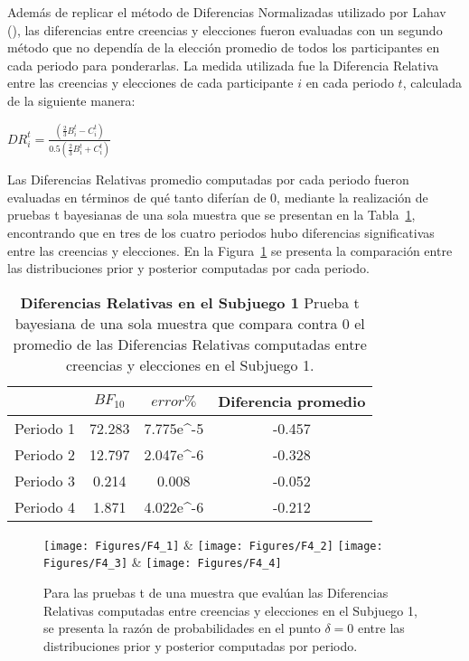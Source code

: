 Además de replicar el método de Diferencias Normalizadas utilizado por Lahav (\citeyear{Lahav}), las diferencias entre creencias y elecciones fueron evaluadas con un segundo método que no dependía de la elección promedio de todos los participantes en cada periodo para ponderarlas. La medida utilizada fue la Diferencia Relativa entre las creencias y elecciones de cada participante $i$ en cada periodo $t$, calculada de la siguiente manera:

\begin{center}
$DR_i^t =  \frac{(\frac{2}{3}B_i^t- C_i^t)}{0.5(\frac{2}{3}B_i^t + C_i^t)}$\\
\end{center}

Las Diferencias Relativas promedio computadas por cada periodo fueron evaluadas en términos de qué tanto diferían de 0, mediante la realización de pruebas t bayesianas de una sola muestra que se presentan en la Tabla~\ref{DR-S1-B}, encontrando que en tres de los cuatro periodos hubo diferencias significativas entre las creencias y elecciones. En la Figura~\ref{fig:DR_S1} se presenta la comparación entre las distribuciones prior y posterior computadas por cada periodo.\\


\begin{table}[h]
\caption[Diferencias Relativas en el Subjuego 1 (prueba t de una muestra)]{\textbf{Diferencias Relativas en el Subjuego 1} Prueba t bayesiana de una sola muestra que compara contra 0 el promedio de las Diferencias Relativas computadas entre creencias y elecciones en el Subjuego 1.}
\label{DR-S1-B}
\centering
\begin{tabular}{l | c c | c}
\toprule
\textbf{} & \textbf{$BF_{10}$} & \textbf{$error\%$} & \textbf{Diferencia promedio}\\
\midrule
Periodo 1 & 72.283 & 7.775e^-5 & -0.457\\
Periodo 2 & 12.797 & 2.047e^-6 & -0.328\\
Periodo 3 & 0.214 & 0.008 & -0.052\\
Periodo 4 & 1.871 & 4.022e^-6 & -0.212\\
\bottomrule
\end{tabular}
\end{table}
	
\begin{figure}[h]
\centering
\texttt{[image: Figures/F4\_1]} & \texttt{[image: Figures/F4\_2]} 
\texttt{[image: Figures/F4\_3]} & \texttt{[image: Figures/F4\_4]} 
\decoRule
\caption[Diferencias Relativas entre creencias y elecciones en el Subjuego 1 (Factor de Bayes)]{Para las pruebas t de una muestra que evalúan las Diferencias Relativas computadas entre creencias y elecciones en el Subjuego 1, se presenta la razón de probabilidades en el punto $\delta = 0$ entre las distribuciones prior y posterior computadas por periodo.}
\label{fig:DR_S1}
\end{figure}

